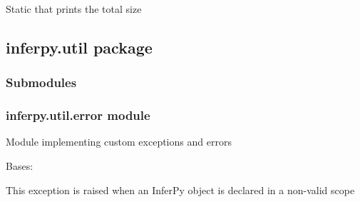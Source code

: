 \documentclass[letterpaper,10pt,english]{sphinxmanual}
\begin{document}
\begin{fulllineitems}
\begin{fulllineitems}
\begin{quote}
\begin{description}
\end{description}\end{quote}

\end{fulllineitems}


\begin{fulllineitems}
\label{\detokenize{modules/inferpy.models:inferpy.models.replicate.replicate.print_total_size}}
Static that prints the total size

\end{fulllineitems}


\end{fulllineitems}



\subsection{inferpy.util package}
\label{\detokenize{modules/inferpy.util:inferpy-util-package}}\label{\detokenize{modules/inferpy.util::doc}}

\subsubsection{Submodules}
\label{\detokenize{modules/inferpy.util:submodules}}

\subsubsection{inferpy.util.error module}
\label{\detokenize{modules/inferpy.util:module-inferpy.util.error}}\label{\detokenize{modules/inferpy.util:inferpy-util-error-module}}
Module implementing custom exceptions and errors

\begin{fulllineitems}
\label{\detokenize{modules/inferpy.util:inferpy.util.error.ScopeException}}
Bases: 

This exception is raised when an InferPy object is declared in a non-valid scope

\end{fulllineitems}
\end{document}
